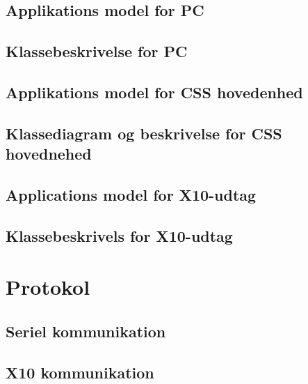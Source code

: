\subsection{Applikations model for PC}

\clearpage

\subsection{Klassebeskrivelse for PC}

\newpage

\subsection{Applikations model for CSS hovedenhed}

\clearpage

\subsection{Klassediagram og beskrivelse for CSS hovednehed}

\newpage

\newpage
\subsection{Applications model for X10-udtag}

\clearpage

\subsection{Klassebeskrivels for X10-udtag}

\newpage

\section{Protokol}

\subsection{Seriel kommunikation}


\subsection{X10 kommunikation}

\newpage